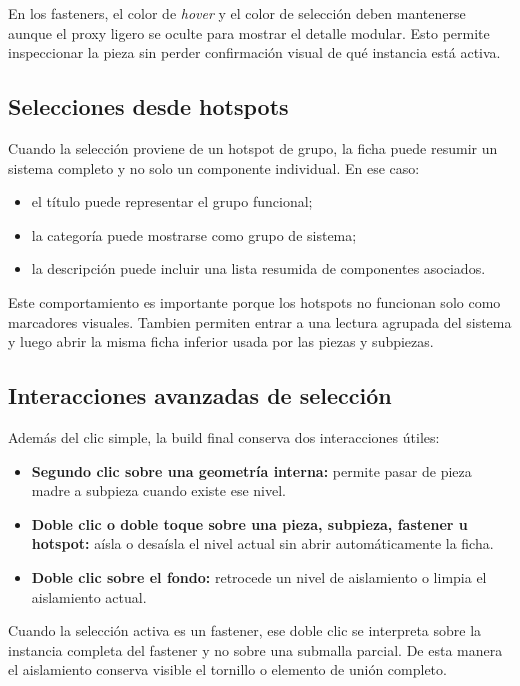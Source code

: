 \documentclass[12pt,letterpaper]{article}
\begin{document}
\noindent En los fasteners, el color de \textit{hover} y el color de selección deben mantenerse aunque el proxy ligero se oculte para mostrar el detalle modular. Esto permite inspeccionar la pieza sin perder confirmación visual de qué instancia está activa.

\subsection{Selecciones desde hotspots}
Cuando la selección proviene de un hotspot de grupo, la ficha puede resumir un sistema completo y no solo un componente individual. En ese caso:
\begin{itemize}
    \item el título puede representar el grupo funcional;
    \item la categoría puede mostrarse como grupo de sistema;
    \item la descripción puede incluir una lista resumida de componentes asociados.
\end{itemize}

\noindent Este comportamiento es importante porque los hotspots no funcionan solo como marcadores visuales. Tambien permiten entrar a una lectura agrupada del sistema y luego abrir la misma ficha inferior usada por las piezas y subpiezas.

\subsection{Interacciones avanzadas de selección}
Además del clic simple, la build final conserva dos interacciones útiles:
\begin{itemize}
    \item \textbf{Segundo clic sobre una geometría interna:} permite pasar de pieza madre a subpieza cuando existe ese nivel.
    \item \textbf{Doble clic o doble toque sobre una pieza, subpieza, fastener u hotspot:} aísla o desaísla el nivel actual sin abrir automáticamente la ficha.
    \item \textbf{Doble clic sobre el fondo:} retrocede un nivel de aislamiento o limpia el aislamiento actual.
\end{itemize}

\noindent Cuando la selección activa es un fastener, ese doble clic se interpreta sobre la instancia completa del fastener y no sobre una submalla parcial. De esta manera el aislamiento conserva visible el tornillo o elemento de unión completo.
\end{document}

